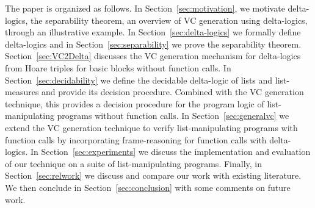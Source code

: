\medskip
\noindent
The paper is organized as follows. In Section~\ref{sec:motivation}, we motivate delta-logics, the separability theorem, an overview of VC generation using delta-logics, through an illustrative example. In Section~\ref{sec:delta-logics} we formally define delta-logics and in Section~\ref{sec:separability} we prove the separability theorem. Section~\ref{sec:VC2Delta} discusses the VC generation mechanism for delta-logics from Hoare triples for basic blocks without function calls. In Section~\ref{sec:decidability} we define the decidable delta-logic of lists and list-measures and provide its decision procedure. Combined with the VC generation technique, this provides a decision procedure for the program logic of list-manipulating programs without function calls. In Section~\ref{sec:generalvc} we extend the VC generation technique to verify list-manipulating programs with function calls by incorporating frame-reasoning for function calls with delta-logics. In Section~\ref{sec:experiments} we discuss the implementation and evaluation of our technique on a suite of list-manipulating programs. Finally, in Section~\ref{sec:relwork} we discuss and compare our work with existing literature. We then conclude in Section~\ref{sec:conclusion} with some comments on future work.
